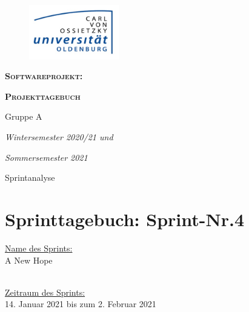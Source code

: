 \documentclass[12pt,a4paper, oneside]{article}
\author{Uni Oldenburg, SWP2020 Gruppe A}
\begin{document}
    \begin{titlepage}
        \pagestyle{empty}
        \begin{center}

            \begin{figure}[h]
                \centering
                \includegraphics[width=0.35\textwidth]{../img/Logo.jpg}
            \end{figure}

            \bigskip \bigskip \noindent
            \textsc{\textbf{\LARGE Softwareprojekt:}} \par \bigskip \noindent
            \textsc{\textbf{\LARGE Projekttagebuch}}


            \par \bigskip \bigskip \bigskip \bigskip \bigskip \noindent
            {\Large Gruppe A} \par \medskip \noindent

            \par \bigskip \bigskip \bigskip \bigskip \bigskip \bigskip \noindent
            \textit{\Large Wintersemester 2020/21 und} \par \noindent
            \textit{\Large Sommersemester 2021}

            \par \bigskip \bigskip \bigskip \bigskip \bigskip \bigskip \noindent
            \par \bigskip \bigskip \bigskip \noindent
            {\Large Sprintanalyse} \par \medskip \noindent

        \end{center}
    \end{titlepage}

    \tableofcontents
    \pagebreak


    \section{Sprinttagebuch: Sprint-Nr.4}
    \underline{Name des Sprints:}
    \\
    A New Hope

    \noindent
    \\
    \underline{Zeitraum des Sprints:}
    \\
    14. Januar 2021 bis zum 2. Februar 2021
\end{document}
